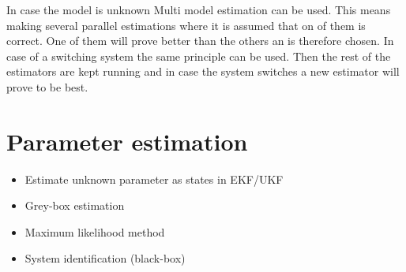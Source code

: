 In case the model is unknown Multi model estimation can be used. This means making several parallel estimations where it is assumed that on of them is correct. One of them will prove better than the others an is therefore chosen. In case of a switching system the same principle can be used. Then the rest of the estimators are kept running and in case the system switches a new estimator will prove to be best.

\section*{Parameter estimation}
\begin{itemize}
        \item Estimate unknown parameter as states in EKF/UKF
        \item Grey-box estimation
        \item Maximum likelihood method
        \item System identification (black-box)
\end{itemize}


